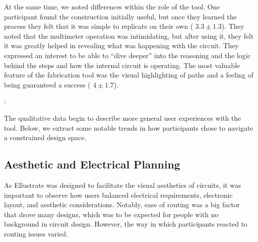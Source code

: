 \documentclass{sigchi}
\begin{document}
  At the same time, we noted differences within the role of the tool. One participant found the construction initially useful, but once they learned the process they felt that it was simple to replicate on their own ( $3.3 \pm 1.3$).   They noted that the multimeter operation was intimidating, but after using it, they felt it was greatly helped in revealing what was happening with the circuit. They expressed an interest to be able to ``dive deeper'' into the reasoning and the logic behind the steps and how the internal circuit is operating. The most valuable feature of the fabrication tool was the visual highlighting of paths and a feeling of being guaranteed a success ( $4 \pm 1.7$). 

  \begin{myquote}
   \vspace{-2pt}
    :
    \vspace{-2pt}
  \end{myquote}
% 
  
  The qualitative data begin to describe more general user experiences with the tool. Below, we extract some notable trends in how participants chose to navigate a constrained design space. 
\subsection{Aesthetic and Electrical Planning}
  As Ellustrate was designed to facilitate the visual aesthetics of circuits, it was important to observe how users balanced electrical requirements, electronic layout, and  aesthetic considerations. Notably, ease of routing was a big factor that drove many designs, which was to be expected for people with no background in circuit design. However, the way in which participants reacted to routing issues varied.
  
\end{document}
